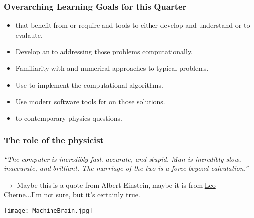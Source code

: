 \documentclass[hyperref={colorlinks=true}]{beamer}
\begin{document}

\begin{frame}%
  \frametitle{Overarching Learning Goals for this Quarter}

  \begin{itemize}
    \item {} that benefit from or require  and tools to either develop and understand or to evalaute. 
    \item Develop an  to addressing those problems computationally.
    \item Familiarity with  and numerical approaches to typical problems.
    \item Use  to implement the computational algorithms. 
    \item Use modern software tools for  on those solutions.
    \item {} to contemporary physics questions.
  \end{itemize}
  
\end{frame}


\begin{frame}%
  \frametitle{The role of the physicist}

  \textit{``The computer is incredibly fast, accurate, and stupid. Man is incredibly slow, inaccurate, and brilliant. The marriage of the two is a force beyond calculation.''}
  
  \vspace{0.4cm}
  
  $\rightarrow$ Maybe this is a quote from Albert Einstein, maybe it is from \href{https://en.wikipedia.org/wiki/Leo\_Cherne}{Leo Cherne}...I'm not sure, but it's certainly true.
  
  \centering
  \texttt{[image: MachineBrain.jpg]}
  
\end{frame}

\end{document}

